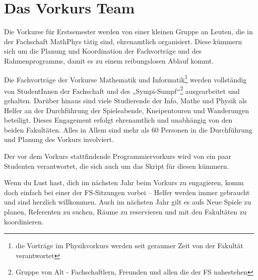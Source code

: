 \section{Das Vorkurs Team}
Die Vorkurse für Erstsemester werden von einer kleinen Gruppe an Leuten, die in der Fachschaft MathPhys tätig sind, ehrenamtlich organisiert. Diese kümmern sich um die Planung und Koordination der Fachvorträge und des Rahmenprogramms, damit es zu einem reibungslosen Ablauf kommt.

Die Fachvorträge der Vorkurse Mathematik und Informatik\footnote{die Vorträge im Physikvorkurs werden seit geraumer Zeit von der Fakultät verantwortet} werden vollständig von StudentInnen der Fachschaft und des „Sympi-Sumpf“\footnote{Gruppe von Alt - Fachschaftlern, Freunden und allen die der FS nahestehen} ausgearbeitet und gehalten. Darüber hinaus sind viele Studierende der Info, Mathe und Physik als Helfer an der Durchführung der Spieleabende, Kneipentouren und Wanderungen beteiligt. Dieses Engagement erfolgt ehrenamtlich und unabhängig von den beiden Fakultäten. Alles in Allem sind mehr als 60 Personen in die Durchführung und Planung des Vorkurs involviert.

Der vor dem Vorkurs stattfindende Programmiervorkurs wird von ein paar Studenten verantwortet, die sich auch um das Skript für diesen kümmern.

Wenn du Lust hast, dich im nächsten Jahr beim Vorkurs zu engagieren, komm doch einfach bei einer der FS-Sitzungen vorbei -- Helfer werden immer gebraucht und sind herzlich willkommen. Auch im nächsten Jahr gilt es aufs Neue Spiele zu planen, Referenten zu suchen, Räume zu reservieren und mit den Fakultäten zu koordinieren.
